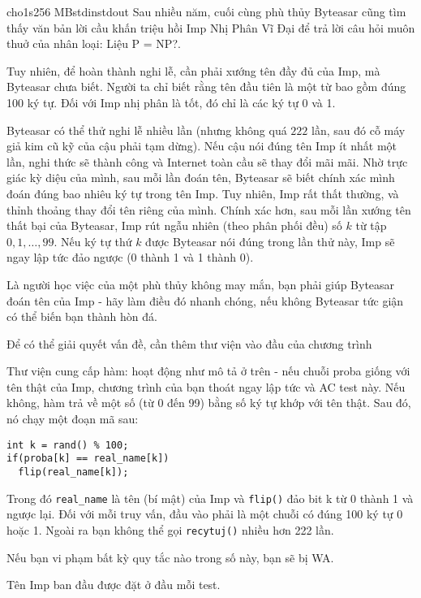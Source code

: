 \begin{problem}{cho}{1s}{256 MB}{stdin}{stdout}
Sau nhiều năm, cuối cùng phù thủy Byteasar cũng tìm thấy văn bản lời cầu khấn triệu
hồi Imp Nhị Phân Vĩ Đại để trả lời câu hỏi muôn thuở của nhân loại: Liệu P = NP?.

Tuy nhiên, để hoàn thành nghi lễ, cần phải xướng tên đầy đủ của Imp, mà Byteasar
chưa biết. Người ta chỉ biết rằng tên đầu tiên là một từ bao gồm đúng 100 ký tự. Đối
với Imp nhị phân là tốt, đó chỉ là các ký tự 0 và 1.

Byteasar có thể thử nghi lễ nhiều lần (nhưng không quá $222$ lần, sau đó cỗ máy giả kim
cũ kỹ của cậu phải tạm dừng). Nếu cậu nói đúng tên Imp ít nhất một lần, nghi thức sẽ
thành công và Internet toàn cầu sẽ thay đổi mãi mãi. Nhờ trực giác kỳ diệu của mình,
sau mỗi lần đoán tên, Byteasar sẽ biết chính xác mình đoán đúng bao nhiêu ký tự trong
tên Imp. Tuy nhiên, Imp rất thất thường, và thỉnh thoảng thay đổi tên riêng của mình.
Chính xác hơn, sau mỗi lần xướng tên thất bại của Byteasar, Imp rút ngẫu nhiên (theo
phân phối đều) số $k$ từ tập $0, 1, \dots, 99$. Nếu ký tự thứ $k$ được Byteasar nói đúng trong
lần thử này, Imp sẽ ngay lập tức đảo ngược (0 thành 1 và 1 thành 0).

Là người học việc của một phù thủy không may mắn, bạn phải giúp Byteasar đoán tên
của Imp - hãy làm điều đó nhanh chóng, nếu không Byteasar tức giận có thể biến bạn
thành hòn đá.


Để có thể giải quyết vấn đề, cần thêm thư viện vào đầu của chương trình


Thư viện cung cấp hàm:
hoạt động như mô tả ở trên - nếu chuỗi proba giống với tên thật của Imp, chương trình
của bạn thoát ngay lập tức và AC test này. Nếu không, hàm trả về một số (từ 0 đến 99)
bằng số ký tự khớp với tên thật. Sau đó, nó chạy một đoạn mã sau:

\begin{verbatim}
int k = rand() % 100;
if(proba[k] == real_name[k])
  flip(real_name[k]);
\end{verbatim}

Trong đó \verb|real_name| là tên (bí mật) của Imp và \verb|flip()| đảo bit k từ 0 thành 1 và ngược lại.
Đối với mỗi truy vấn, đầu vào phải là một chuỗi có đúng 100 ký tự 0 hoặc 1. Ngoài ra
bạn không thể gọi \texttt{recytuj()} nhiều hơn 222 lần.

Nếu bạn vi phạm bất kỳ quy tắc nào trong số này, bạn sẽ bị WA.

Tên Imp ban đầu được đặt ở đầu mỗi test.


\end{problem}